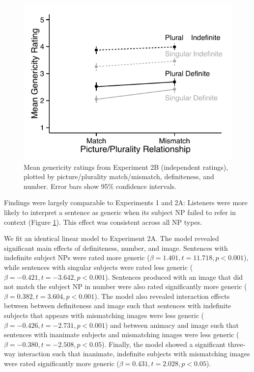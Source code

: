 \documentclass[10pt,letterpaper]{article}
\begin{document}
\begin{figure}[t]
\centering
\includegraphics[width=.9\linewidth]{figures/e2b_mod.pdf}
\caption{\label{fig:e2b} Mean genericity ratings from Experiment 2B (independent ratings), plotted by picture/plurality match/mismatch, definiteness, and number. Error bars show 95\% confidence intervals.} 
\end{figure}

Findings were largely comparable to Experiments 1 and 2A: Listeners were more likely to interpret a sentence as generic when its subject NP failed to refer in context (Figure \ref{fig:e2b}). This effect was consistent across all NP types. 

We fit an identical linear model to Experiment 2A. The model revealed significant main effects of definiteness, number, and image. Sentences with indefinite subject NPs were rated more generic (\(\beta = 1.401, t = 11.718, p < 0.001\)), while sentences with singular subjects were rated less generic (\(\beta = -0.421, t = -3.642, p < 0.001\)). Sentences produced with an image that did not match the subject NP in number were also rated significantly more generic (\(\beta = 0.382, t = 3.604, p < 0.001\)). The model also revealed interaction effects between between definiteness and image such that sentences with indefinite subjects that appears with mismatching images were less generic (\(\beta = -0.426, t = -2.731, p < 0.001\)) and between animacy and image such that sentences with inanimate subjects and mismatching images were less generic (\(\beta = -0.380, t=-2.508, p<0.05\)). Finally, the model showed a significant three-way interaction such that inanimate, indefinite subjects with mismatching images were rated significantly more generic (\(\beta = 0.431, t = 2.028, p < 0.05\)). 
\end{document}
